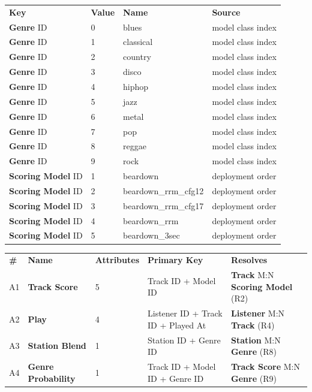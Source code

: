 \documentclass[11pt]{article}
\newcommand{\ent}[1]{\textcolor{entc}{\textbf{#1}}}
\newcommand{\asc}[1]{\textcolor{ascc}{\textbf{#1}}}
\begin{document}
\begin{longtable}{|L{1.30in}|L{0.80in}|L{2.00in}|L{2.20in}|}
\hline
{} \\ \hline
{}\textbf{Key} & \textbf{Value} & \textbf{Name} & \textbf{Source} \\ \hline
\ent{Genre} ID & 0 & blues & model class index \\ \hline
\ent{Genre} ID & 1 & classical & model class index \\ \hline
\ent{Genre} ID & 2 & country & model class index \\ \hline
\ent{Genre} ID & 3 & disco & model class index \\ \hline
\ent{Genre} ID & 4 & hiphop & model class index \\ \hline
\ent{Genre} ID & 5 & jazz & model class index \\ \hline
\ent{Genre} ID & 6 & metal & model class index \\ \hline
\ent{Genre} ID & 7 & pop & model class index \\ \hline
\ent{Genre} ID & 8 & reggae & model class index \\ \hline
\ent{Genre} ID & 9 & rock & model class index \\ \hline
\ent{Scoring Model} ID & 1 & beardown & deployment order \\ \hline
\ent{Scoring Model} ID & 2 & beardown\_rrm\_cfg12 & deployment order \\ \hline
\ent{Scoring Model} ID & 3 & beardown\_rrm\_cfg17 & deployment order \\ \hline
\ent{Scoring Model} ID & 4 & beardown\_rrm & deployment order \\ \hline
\ent{Scoring Model} ID & 5 & beardown\_3sec & deployment order \\ \hline
\end{longtable}

\begin{longtable}{|L{0.40in}|L{1.30in}|L{0.85in}|L{2.05in}|L{1.60in}|}
\hline
{} \\ \hline
{}\textbf{\#} & \textbf{Name} & \textbf{Attributes} & \textbf{Primary Key} & \textbf{Resolves} \\ \hline
A1 & \asc{Track Score} & 5 & Track ID + Model ID & \ent{Track} M:N \ent{Scoring Model} (R2) \\ \hline
A2 & \asc{Play} & 4 & Listener ID + Track ID + Played At & \ent{Listener} M:N \ent{Track} (R4) \\ \hline
A3 & \asc{Station Blend} & 1 & Station ID + Genre ID & \ent{Station} M:N \ent{Genre} (R8) \\ \hline
A4 & \asc{Genre Probability} & 1 & Track ID + Model ID + Genre ID & \asc{Track Score} M:N \ent{Genre} (R9) \\ \hline
\end{longtable}
\end{document}
